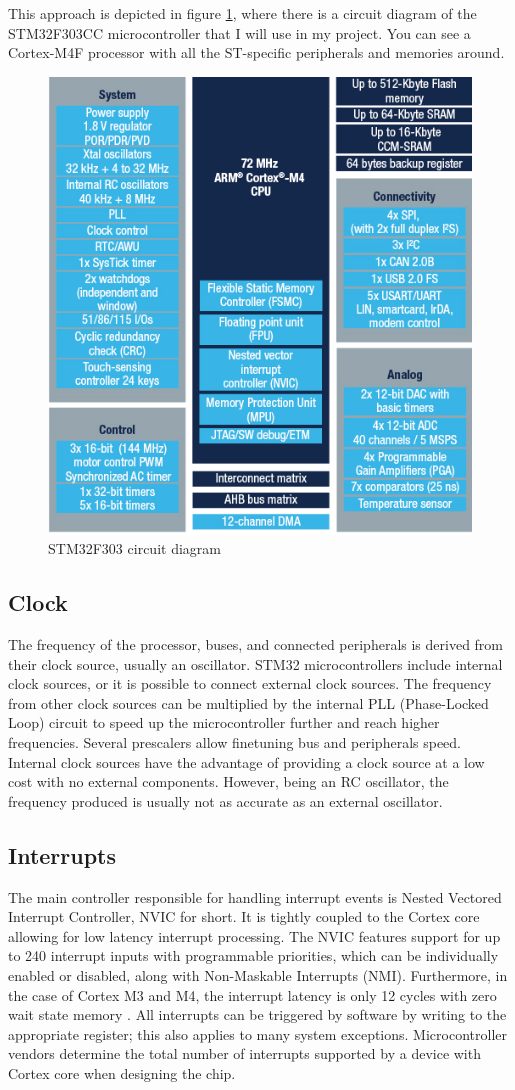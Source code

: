 This approach is depicted in figure \ref{fig:f303}, where there is a circuit diagram of the STM32F303CC microcontroller that I will use in my project.  You can see a Cortex-M4F processor with all the ST-specific peripherals and memories around.
\begin{figure}
\centering
\includegraphics[width=0.6\linewidth]{support/pic/en.bd_stm32f303.jpg}
\caption{STM32F303 circuit diagram \cite{f303_diagram}} %
\label{fig:f303}
\end{figure}

	\subsection{Clock}
	\label{sub:clock}
The frequency of the processor, buses, and connected peripherals is derived from their clock source, usually an oscillator. STM32 microcontrollers include internal clock sources, or it is possible to connect external clock sources. The frequency from other clock sources can be multiplied by the internal PLL (Phase-Locked Loop) circuit to speed up the microcontroller further and reach higher frequencies. Several prescalers allow finetuning bus and peripherals speed. Internal clock sources have the advantage of providing a clock source at a low cost with no external components. However, being an RC oscillator, the frequency produced is usually not as accurate as an external oscillator.

	\subsection{Interrupts}
	\label{sub:nvic}
The main controller responsible for handling interrupt events is Nested Vectored Interrupt Controller, NVIC for short. It is tightly coupled to the Cortex core allowing for low latency interrupt processing. The NVIC features support for up to 240 interrupt inputs with programmable priorities, which can be individually enabled or disabled, along with Non-Maskable Interrupts (NMI). Furthermore, in the case of Cortex M3 and M4, the interrupt latency is only 12 cycles with zero wait state memory \cite{yu}. All interrupts can be triggered by software by writing to the appropriate register; this also applies to many system exceptions. Microcontroller vendors determine the total number of interrupts supported by a device with Cortex core when designing the chip.

